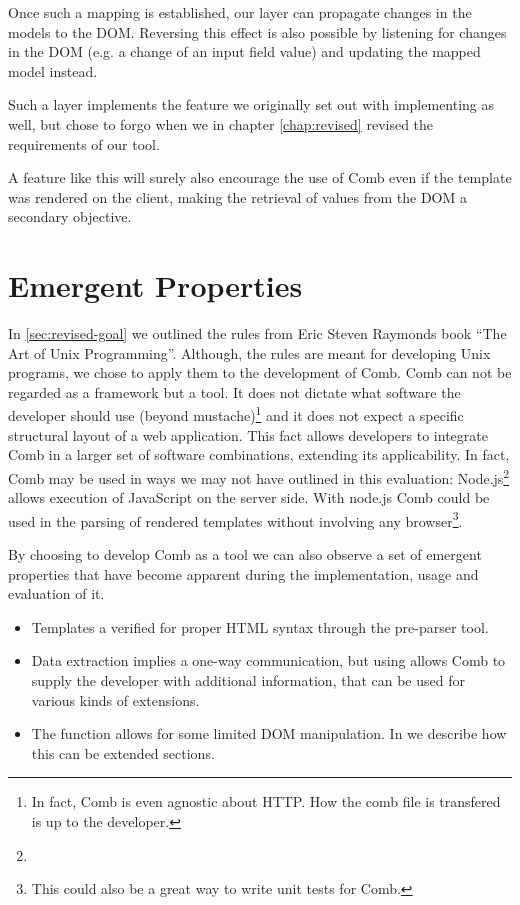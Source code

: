 \documentclass[thesis.tex]{subfiles}
\begin{document}
Once such a mapping is established, our layer can propagate changes in the
models to the DOM. Reversing this effect is also possible by listening for
changes in the DOM (e.g. a change of an input field value) and updating the
mapped model instead.

Such a layer implements the feature we originally set out with implementing as
well, but chose to forgo when we in chapter \ref{chap:revised} revised the
requirements of our tool.

A feature like this will surely also encourage the use of Comb even if the
template was rendered on the client, making the retrieval of values from the DOM
a secondary objective.



\section{Emergent Properties}

In \ref{sec:revised-goal} we outlined the rules from Eric Steven Raymonds book
``The Art of Unix Programming''. Although, the rules are meant for developing
Unix programs, we chose to apply them to the development of Comb.
Comb can not be regarded as a framework but a tool. It does not dictate what
software the developer should use (beyond mustache)\footnote{
	In fact, Comb is even agnostic about HTTP. How the comb file is transfered
	is up to the developer.
} and it does not expect a specific structural layout of a web application.
This fact allows developers to integrate Comb in a larger set of software
combinations, extending its applicability.
In fact, Comb may be used in ways we may not have outlined in this evaluation:
Node.js\footnote{} allows execution of JavaScript on the
server side. With node.js Comb could be used in the parsing of rendered
templates without involving any browser\footnote{
	This could also be a great way to write unit tests for Comb.
}.

By choosing to develop Comb as a tool we can also observe a set of emergent
properties that have become apparent during the implementation, usage and
evaluation of it.

\begin{itemize}
\item Templates a verified for proper HTML syntax through the pre-parser tool.
\item Data extraction implies a one-way communication, but using
       allows Comb to supply the developer with additional
      information, that can be used for various kinds of extensions.
\item The  function allows for some limited DOM manipulation.
      In \label{sec:update-dom} we describe how this can be extended sections.
\end{itemize}
\end{document}
